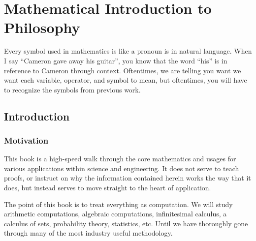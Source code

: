 \documentclass[11pt,twoside,letterpaper,fleqn,parskip=full]{book}
\begin{document}
\part{Mathematical Introduction to Philosophy}



\pagestyle{fancy} %

Every symbol used in mathematics is like a pronoun is in natural language. When I say ``Cameron gave away his guitar'', you know that the word ``his'' is in reference to Cameron through context. Oftentimes, we are telling you want we want each variable, operator, and symbol to mean, but oftentimes, you will have to recognize the symbols from previous work.












\chapter{Introduction}

\section{Motivation}
This book is a high-speed walk through the core mathematics and usages for various applications within science and engineering. It does not serve to teach proofs, or instruct on why the information contained herein works the way that it does, but instead serves to move straight to the heart of application.

The point of this book is to treat everything as computation. We will study arithmetic computations, algebraic computations, infinitesimal calculus, a calculus of sets, probability theory, statistics, etc. Until we have thoroughly gone through many of the most industry useful methodology.
\end{document}

